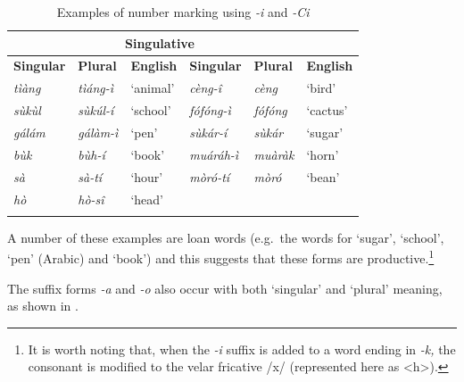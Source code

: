 \documentclass[output=paper]{langsci/langscibook}
\begin{document}
\begin{table}
\begin{tabularx}{\textwidth}{XXXXXX}
\lsptoprule

\multicolumn{3}{c}{ \textbf{Plurative}} & \multicolumn{3}{c}{ \textbf{Singulative}}\\ \midrule
 \textbf{Singular} & \textbf{Plural} & \textbf{English} & \textbf{Singular} & \textbf{Plural} & \textbf{English}\\ \midrule
\itshape t\`{i}\`{a}ng & \itshape t\`{i}\'{a}ng-\`{i} & ‘animal’ & \itshape c\`{e}ng-\^{i} & \itshape c\`{e}ng & ‘bird’\\
\itshape s\`{u}k\`{u}l & \itshape s\`{u}k\'{u}l-\'{i} & ‘school’ & \itshape f\'{o}f\'{o}ng-\`{i} & \itshape f\'{o}f\'{o}ng & ‘cactus’\\
\itshape g\'{a}l\'{a}m & \itshape g\'{a}l\`{a}m-\`{i} & ‘pen’ & \itshape s\`{u}k\'{a}r-\'{i} & \itshape s\`{u}k\'{a}r & ‘sugar’\\
\itshape b\`{u}k & \itshape b\`{u}h-\'{i} & ‘book’ & \itshape mu\'{a}r\'{a}h-\`{i} & \itshape mu\`{a}r\`{a}k & ‘horn’\\
\itshape s\`{a} & \itshape s\`{a}-t\'{i} & ‘hour’ & \itshape m\`{o}r\'{o}-t\'{i} & \itshape m\`{o}r\'{o} & ‘bean’\\
\itshape h\`{o} & \itshape h\`{o}-s\^{i} & ‘head’ &  &  & \\
\lspbottomrule
\end{tabularx}
\caption{Examples of number marking using \textit{-i} and \textit{{}-Ci}}
\label{tab:moodie:10}
\end{table}

A number of these examples are loan words (e.g.\ the words for ‘sugar’, ‘school’, ‘pen’ (Arabic) and ‘book’) and this suggests that these forms are productive.\footnote{ It is worth noting that, when the \textit{{}-i} suffix is added to a word ending in \textit{{}-k,} the consonant is modified to the velar fricative /x/ (represented here as {\textless}h{\textgreater}).} 

The suffix forms \textit{{}-a }and \textit{{}-o} also occur with both `singular' and `plural' meaning, as shown in . 
\end{document}

